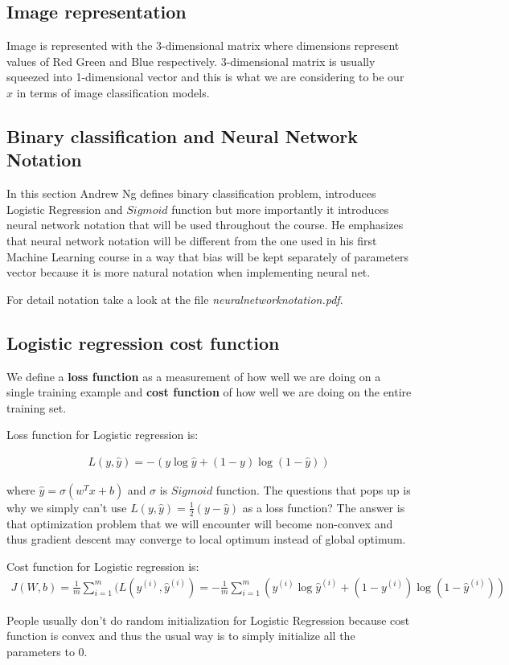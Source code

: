 \documentclass[a4paper]{article}
\begin{document}
\subsection{Image representation}
Image is represented with the 3-dimensional matrix where dimensions represent values of Red Green and Blue respectively. 3-dimensional matrix is usually squeezed into 1-dimensional vector and this is what we are considering to be our $x$ in terms of image classification models.

\subsection{Binary classification and Neural Network Notation}
In this section Andrew Ng defines binary classification problem, introduces Logistic Regression and $Sigmoid$ function but more importantly it introduces neural network notation that will be used throughout the course. He emphasizes that neural network notation will be different from the one used in his first Machine Learning course in a way that bias will be kept separately of parameters vector because it is more natural notation when implementing neural net.

For detail notation take a look at the file \textit{neuralnetworknotation.pdf}.

\subsection{Logistic regression cost function}
We define a \textbf{loss function} as a measurement of how well we are doing on a single training example and \textbf{cost function} of how well we are doing on the entire training set.

Loss function for Logistic regression is:

\begin{align}
L(y, \hat{y}) = -(y\log{\hat{y}} + (1 - y)\log{(1 - \hat{y})})
\end{align}

where $\hat{y} = \sigma(w^Tx + b)$ and $\sigma$ is $Sigmoid$ function.
The questions that pops up is why we simply can't use $L(y, \hat{y}) = \frac{1}{2}(y - \hat{y})$ as a loss function? The answer is that optimization problem that we will encounter will become non-convex and thus gradient descent may converge to local optimum instead of global optimum.

Cost function for Logistic regression is:
\begin{align}
J(W, b) = \frac{1}{m}\sum_{i = 1}^{m}(L(y^{(i)}, \hat{y}^{(i)}) = -\frac{1}{m}\sum_{i = 1}^{m}(y^{(i)}\log{\hat{y}^{(i)}} + (1 - y^{(i)})\log{(1 - \hat{y}^{(i)})})
\end{align}

People usually don't do random initialization for Logistic Regression because cost function is convex and thus the usual way is to simply initialize all the parameters to $0$.
\end{document}
